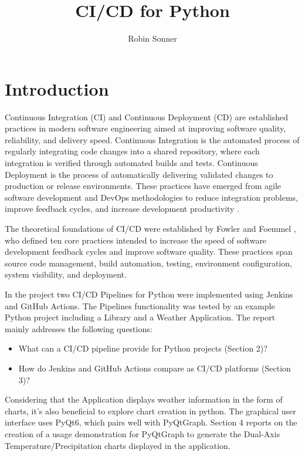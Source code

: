 \documentclass{llncs}
\title{CI/CD for Python}
\author{Robin Sonner}
\institute{University Freiburg, Freiburg, Germany}
\begin{document}
\maketitle

\section{Introduction}

Continuous Integration (CI) and Continuous Deployment (CD) are established practices in modern software engineering aimed at improving software quality, reliability, and delivery speed. Continuous Integration is the automated process of regularly integrating code changes into a shared repository, where each integration is verified through automated builds and tests. Continuous Deployment is the process of automatically delivering validated changes to production or release environments. These practices have emerged from agile software development and DevOps methodologies to reduce integration problems, improve feedback cycles, and increase development productivity \cite{shahin2017}.

The theoretical foundations of CI/CD were established by Fowler and Foemmel \cite{fowler2006}, who defined ten core practices intended to increase the speed of software development feedback cycles and improve software quality. These practices span source code management, build automation, testing, environment configuration, system visibility, and deployment.

In the project two CI/CD Pipelines for Python were implemented using Jenkins and GitHub Actions. The Pipelines functionality was tested by an example Python project including a Library and a Weather Application. The report mainly addresses the following questions:

\begin{itemize}
\item What can a CI/CD pipeline provide for Python projects (Section 2)?
\item How do Jenkins and GitHub Actions compare as CI/CD platforms (Section 3)?
\end{itemize}

Considering that the Application displays weather information in the form of charts, it's also beneficial to explore chart creation in python. The graphical user interface uses PyQt6, which pairs well with PyQtGraph. Section 4 reports on the creation of a usage demonstration for PyQtGraph to generate the Dual-Axis Temperature/Precipitation charts displayed in the application. 
\end{document}
